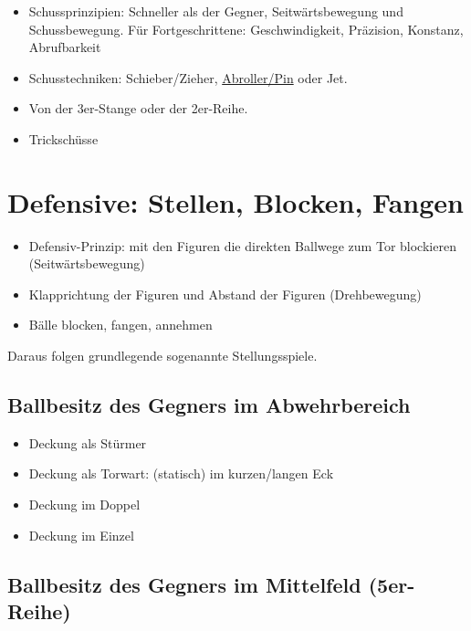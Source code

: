 \begin{itemize}
\item Schussprinzipien: Schneller als der Gegner, Seitwärtsbewegung und Schussbewegung. Für Fortgeschrittene: Geschwindigkeit, Präzision, Konstanz, Abrufbarkeit
\item Schusstechniken: Schieber/Zieher, \href{http://ungeblogtkickern.blogspot.de/2014/07/schritt-fur-schritt-pin-schieen.html}{Abroller/Pin} oder Jet.
\item Von der 3er-Stange oder der 2er-Reihe.
\item Trickschüsse
\end{itemize}





\section{Defensive: Stellen, Blocken, Fangen}
\label{technik:defensive}

\begin{itemize}
\item Defensiv-Prinzip: mit den Figuren die direkten Ballwege zum Tor blockieren (Seitwärtsbewegung)  
\item Klapprichtung der Figuren und Abstand der Figuren (Drehbewegung)
\item Bälle blocken, fangen, annehmen 
\end{itemize}
Daraus folgen grundlegende sogenannte Stellungsspiele.


\subsection{Ballbesitz des Gegners im Abwehrbereich}
\label{technik:defensive:gegnerabwehr}

\begin{itemize}
\item Deckung als Stürmer
\item Deckung als Torwart: (statisch) im kurzen/langen Eck
\item Deckung im Doppel
\item Deckung im Einzel
\end{itemize}


\subsection{Ballbesitz des Gegners im Mittelfeld (5er-Reihe)}
\label{technik:defensive:gegnermittelfeld}

